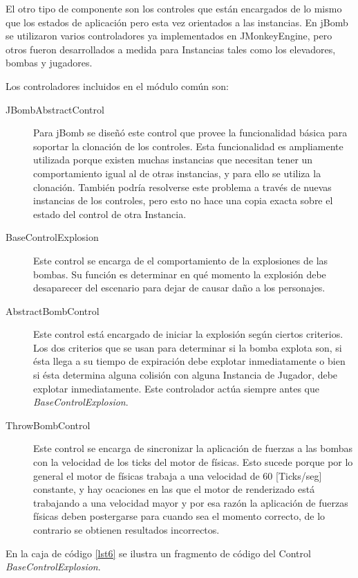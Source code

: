 \documentclass[a4paper,12pt,openany,oneside]{book}
\begin{document}
El otro tipo de componente son los controles que están encargados de lo mismo que los estados de aplicación pero esta vez orientados a las instancias. En jBomb se utilizaron varios controladores ya implementados en JMonkeyEngine, pero otros fueron desarrollados a medida para Instancias tales como los elevadores, bombas y jugadores.

Los controladores incluidos en el módulo común son:
\begin{description}
\item[JBombAbstractControl] Para jBomb se diseñó este control que provee la funcionalidad básica para soportar la clonación de los controles. Esta funcionalidad es ampliamente utilizada porque existen muchas instancias que necesitan tener un comportamiento igual al de otras instancias, y para ello se utiliza la clonación. También podría resolverse este problema a través de nuevas instancias de los controles, pero esto no hace una copia exacta sobre el estado del control de otra Instancia.
\item[BaseControlExplosion] Este control se encarga de el comportamiento de la explosiones de las bombas. Su función es determinar en qué momento la explosión debe desaparecer del escenario para dejar de causar daño a los personajes.
\item[AbstractBombControl] Este control está encargado de iniciar la explosión según ciertos criterios. Los dos criterios que se usan para determinar si la bomba explota son, si ésta llega a su tiempo de expiración debe explotar inmediatamente o bien si ésta determina alguna colisión con alguna Instancia de Jugador, debe explotar inmediatamente. Este controlador actúa siempre antes que \textit{BaseControlExplosion}.
\item[ThrowBombControl] Este control se encarga de sincronizar la aplicación de fuerzas a las bombas con la velocidad de los ticks del motor de físicas. Esto sucede porque por lo general el motor de físicas trabaja a una velocidad de 60 [Ticks/seg] constante, y hay ocaciones en las que el motor de renderizado está trabajando a una velocidad mayor y por esa razón la aplicación de fuerzas físicas deben postergarse para cuando sea el momento correcto, de lo contrario se obtienen resultados incorrectos.
\end{description}
En la caja de código \ref{lst6} se ilustra un fragmento de código del Control \textit{BaseControlExplosion}.
\end{document}
